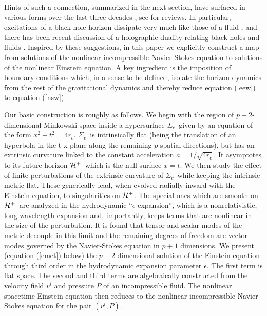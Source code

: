 \documentclass{article}
\def\e{{\epsilon}}
\def\sc{$\Sigma_c$}
\def\hp{${\cal H}^+$}
\begin{document}
Hints of such a connection, summarized in the next section, have surfaced in various forms over the last three decades \cite{thesDamour,Damsurf,Price,Jacobson:1995ab,Bousso:1999xy,Policastro:2001yc,Policastro:2002se,Kovtun:2003wp,Karch:2003zd,Kovtun:2004de,Gourgoulhon:2005ng,Kovtun:2005ev,Hubeny:2009zz,Bhattacharyya:2008jc,Bhattacharyya:2008ji,Eling:2008af,Bhattacharyya:2008mz,Fouxon:2008tb,Gupta:2008th,Fouxon:2008ik,Eling:2009pb,Eling:2009sj,Paulos:2009yk,Padmanabhan:2009vy,Eling:2010vr,bkls}, see \cite{Son:2007vk,Damour:2008ji,Rangamani:2009xk,Padmanabhan:2009vy,Hubeny:2010wp} for reviews. In particular, excitations of a black hole horizon dissipate very much like those of a fluid \cite{Hawking:1972hy,Hartle:1973zz,Hartle:1974gy,thesDamour,Price,Gourgoulhon:2005ng, Damsurf,bkls,Kovtun:2004de}, and there has been recent discussion of a holographic duality relating black holes and fluids \cite{Hubeny:2009zz,Bhattacharyya:2008jc,Eling:2009pb,min,Kovtun:2003wp,Policastro:2002se,Policastro:2001yc,Kovtun:2005ev,Bhattacharyya:2008mz,Bhattacharyya:2008ji,Gupta:2008th,Eling:2009sj,Kovtun:2004de}. Inspired by these suggestions, in this paper we explicitly construct a map from solutions of the nonlinear incompressible Navier-Stokes equation to solutions of the nonlinear Einstein equation.  A key ingredient is the imposition of boundary conditions which, in a sense to be defined, isolate the horizon dynamics from the rest of the gravitational dynamics and thereby reduce equation (\ref{eew}) to equation (\ref{nsw}).

Our basic construction is roughly as follows. We begin with the region of $p+2$-dimensional Minkowski space inside a hypersurface \sc\ given by an equation of the form $x^2-t^2=4r_c$. \sc\ is intrinsically flat (being the translation of an hyperbola in the t-x plane along the remaining $p$  spatial directions), but has an extrinsic curvature linked to the constant
acceleration $a= 1/ \sqrt {4 r_c}$.  It  asymptotes to its future horizon \hp\ which is the null surface $x=t$. We then study the effect of finite perturbations of the extrinsic curvature of \sc\ while keeping the intrinsic metric flat. These generically lead, when evolved radially inward with the Einstein equation, to singularities on \hp. The special ones which are smooth on \hp\ are analyzed in the hydrodynamic ``$\e$-expansion'', which is a nonrelativistic, long-wavelength expansion and, importantly, keeps terms that are nonlinear in the size of the perturbation. It is found that tensor and scalar modes of the metric decouple in this limit and the remaining degrees of freedom are vector modes governed by the Navier-Stokes equation in $p+1$ dimensions.  We present (equation (\ref{emet}) below) the $p+2$-dimensional solution of the Einstein equation through third order in the hydrodynamic expansion parameter $\e$. The first term is flat space. The second and third terms are algebraically constructed from the velocity field $v^i$ and pressure $P$ of an incompressible fluid. The nonlinear spacetime Einstein equation then reduces to the nonlinear incompressible Navier-Stokes equation for the pair $(v^i, P)$.
\end{document}
